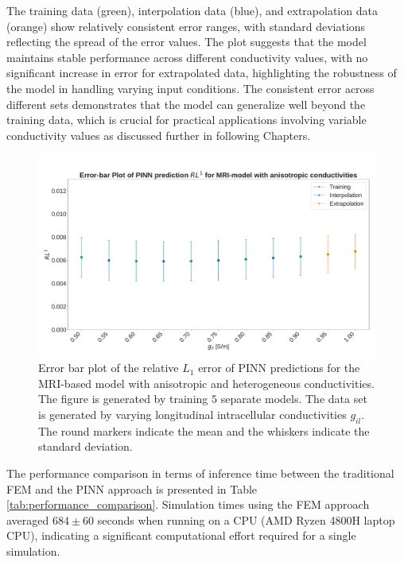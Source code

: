 The training data (green), interpolation data (blue), and extrapolation data (orange) show relatively consistent error ranges, with standard deviations reflecting the spread of the error values. The plot suggests that the model maintains stable performance across different conductivity values, with no significant increase in error for extrapolated data, highlighting the robustness of the model in handling varying input conditions. The consistent error across different sets demonstrates that the model can generalize well beyond the training data, which is crucial for practical applications involving variable conductivity values as discussed further in following Chapters.
\begin{figure}[H]
  \centering
  \includegraphics[width=\textwidth]{Figs/Anisotropic/Mean_Errorbar_plot_aniso.pdf}
  \caption{Error bar plot of the relative \( L_1 \) error of PINN predictions for the MRI-based model with anisotropic and heterogeneous conductivities. The figure is generated by training $5$ separate models. The data set is generated by varying longitudinal intracellular conductivities $g_{il}$. The round markers indicate the mean and the whiskers indicate the standard deviation.  }
  \label{fig:box_plot_MRI_aniso}
\end{figure}
\newpage
The performance comparison in terms of inference time between the traditional FEM and the PINN approach is presented in Table \ref{tab:performance_comparison}. Simulation times using the FEM approach averaged $684 \pm 60$ seconds when running on a CPU (AMD Ryzen 4800H laptop CPU), indicating a significant computational effort required for a single simulation. 

